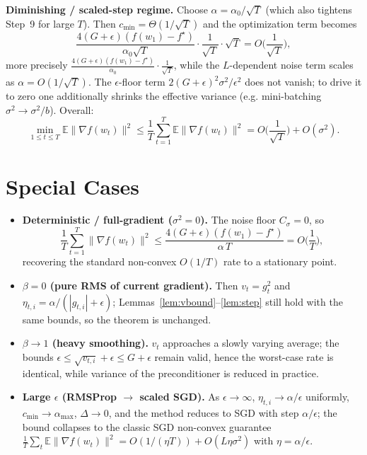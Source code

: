 \documentclass[11pt]{article}
\begin{document}
\textbf{Diminishing / scaled-step regime.}
Choose $\alpha = \alpha_0/\sqrt{T}$ (which also tightens Step~9 for large
$T$). Then $c_{\min}=\Theta(1/\sqrt T)$ and the optimization term becomes
\[
\frac{4(G+\epsilon)(f(w_1)-f^\star)}{\alpha_0\sqrt T}\cdot\frac{1}{\sqrt T}\cdot\sqrt T
= O\!\Big(\frac{1}{\sqrt T}\Big),
\]
more precisely
$\frac{4(G+\epsilon)(f(w_1)-f^\star)}{\alpha_0}\cdot\frac{1}{\sqrt T}$,
while the $L$-dependent noise term scales as $\alpha=O(1/\sqrt T)$. The
$\epsilon$-floor term $2(G+\epsilon)^2\sigma^2/\epsilon^2$ does not vanish;
to drive it to zero one additionally shrinks the effective variance (e.g.
mini-batching $\sigma^2\to\sigma^2/b$). Overall:
\[
\min_{1\le t\le T}\mathbb E\|\nabla f(w_t)\|^2
\le \frac{1}{T}\sum_{t=1}^T \mathbb E\|\nabla f(w_t)\|^2
= O\!\Big(\frac{1}{\sqrt T}\Big) + O(\sigma^2).
\]

\section*{Special Cases}

\begin{itemize}
  \item \textbf{Deterministic / full-gradient ($\sigma^2=0$).}
        The noise floor $C_\sigma=0$, so
        \[
        \frac{1}{T}\sum_{t=1}^T \|\nabla f(w_t)\|^2
        \le \frac{4(G+\epsilon)(f(w_1)-f^\star)}{\alpha\,T}
        = O\!\Big(\frac1T\Big),
        \]
        recovering the standard non-convex $O(1/T)$ rate to a stationary
        point.

  \item \textbf{$\beta=0$ (pure RMS of current gradient).}
        Then $v_t = g_t^2$ and $\eta_{t,i}=\alpha/(|g_{t,i}|+\epsilon)$;
        Lemmas~\ref{lem:vbound}--\ref{lem:step} still hold with the same
        bounds, so the theorem is unchanged.

  \item \textbf{$\beta\to 1$ (heavy smoothing).}
        $v_t$ approaches a slowly varying average; the bounds
        $\epsilon\le\sqrt{v_{t,i}}+\epsilon\le G+\epsilon$ remain valid,
        hence the worst-case rate is identical, while variance of the
        preconditioner is reduced in practice.

  \item \textbf{Large $\epsilon$ (RMSProp $\to$ scaled SGD).}
        As $\epsilon\to\infty$, $\eta_{t,i}\to\alpha/\epsilon$ uniformly,
        $c_{\min}\to\alpha_{\max}$, $\Delta\to0$, and the method reduces to
        SGD with step $\alpha/\epsilon$; the bound collapses to the classic
        SGD non-convex guarantee
        $\frac{1}{T}\sum_t\mathbb E\|\nabla f(w_t)\|^2
        =O(1/(\eta T))+O(L\eta\sigma^2)$ with $\eta=\alpha/\epsilon$.
\end{itemize}
\end{document}
